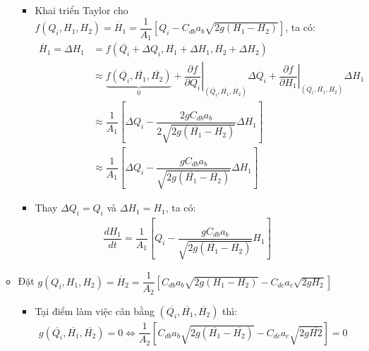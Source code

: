 \documentclass[12pt,a4paper]{article}
\begin{document}
\begin{enumerate}[\it a.]
\begin{itemize}
\begin{itemize}
                            \item Khai triển Taylor cho $f\left({Q_i, H_1, H_2}\right) = \dot{H_1} = \dfrac{1}{A_1} \left[{Q_i - C_{db}a_b\sqrt{2g(H_1 - H_2)}}\right]$, ta có:
                                \begin{align}
                                    \dot{H_1} = \Delta H_1 & = f\left({\overline{Q_i} + \Delta Q_i, \overline{H_1} + \Delta H_1, \overline{H_2} + \Delta H_2}\right) \\
                                    & \approx \underbrace{f\left({ \overline{Q_i}, \overline{H_1}, \overline{H_2}}\right)}_{0} + \left.\dfrac{\partial f}{\partial Q_i}\right|_{ \left({ \overline{Q_i}, \overline{H_1}, \overline{H_2}}\right)} \Delta Q_i + \left.\dfrac{\partial f}{\partial H_1}\right|_{ \left({ \overline{Q_i}, \overline{H_1}, \overline{H_2}}\right)} \Delta H_1\\
                                    & \approx \dfrac{1}{A_1} \left[{\Delta Q_i - \dfrac{2gC_{db}a_b}{2\sqrt{2g(\overline{H_1} - \overline{H_2})}} \Delta H_1}\right]\\
                                    & \approx \dfrac{1}{A_1} \left[{\Delta Q_i - \dfrac{gC_{db}a_b}{\sqrt{2g(\overline{H_1} - \overline{H_2})}} \Delta H_1}\right]
                                \end{align}

                            \item Thay $\Delta Q_i = Q_i$ và $\Delta H_1 = H_1$, ta có:
                                \begin{align}
                                    \dfrac{d H_1}{dt} = \dfrac{1}{A_1} \left[{Q_i - \dfrac{gC_{db}a_b}{\sqrt{2g(\overline{H_1} - \overline{H_2})}} H_1}\right]
                                \end{align}
                        \end{itemize}

                    \item Đặt $g\left({Q_i, H_1, H_2}\right) = \dot{H_2} = \dfrac{1}{A_2} \left[{C_{db}a_b\sqrt{2g(H_1 - H_2)} - C_{dc}a_c\sqrt{2gH_2}}\right]$
                        \begin{itemize}
                            \item Tại điểm làm việc cân bằng $\left({ \overline{Q_i}, \overline{H_1}, \overline{H_2}}\right)$ thì:
                                \begin{align}
                                    g\left({ \overline{Q_i}, \overline{H_1}, \overline{H_2}}\right) = 0 \Longleftrightarrow \dfrac{1}{A_2} \left[{C_{db}a_b\sqrt{2g(\overline{H_1} - \overline{H_2})} - C_{dc}a_c\sqrt{2g \overline{H2}}}\right] = 0
                                \end{align}


\end{itemize}
\end{itemize}
\end{enumerate}
\end{document}
